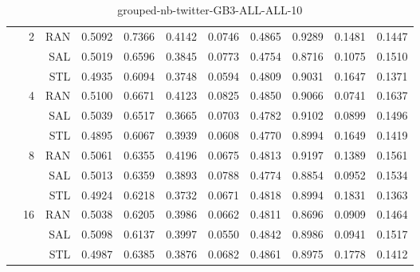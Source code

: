 \begin{center}
\begin{table}[htbp]
\begin{center}
\begin{tabular}{ | r | r | r | r | r | r | r | r | r | r | r |}
 & \multirow{3}{*}{2} & RAN & 0.5092 & 0.7366 & 0.4142 & 0.0746 & 0.4865 & 0.9289 & 0.1481 & 0.1447\\ \cline{3-11}
 &   & SAL & 0.5019 & 0.6596 & 0.3845 & 0.0773 & 0.4754 & 0.8716 & 0.1075 & 0.1510\\ \cline{3-11}
 &   & STL & 0.4935 & 0.6094 & 0.3748 & 0.0594 & 0.4809 & 0.9031 & 0.1647 & 0.1371\\ \cline{2-11}
 & \multirow{3}{*}{4} & RAN & 0.5100 & 0.6671 & 0.4123 & 0.0825 & 0.4850 & 0.9066 & 0.0741 & 0.1637\\ \cline{3-11}
 &   & SAL & 0.5039 & 0.6517 & 0.3665 & 0.0703 & 0.4782 & 0.9102 & 0.0899 & 0.1496\\ \cline{3-11}
 &   & STL & 0.4895 & 0.6067 & 0.3939 & 0.0608 & 0.4770 & 0.8994 & 0.1649 & 0.1419\\ \cline{2-11}
 & \multirow{3}{*}{8} & RAN & 0.5061 & 0.6355 & 0.4196 & 0.0675 & 0.4813 & 0.9197 & 0.1389 & 0.1561\\ \cline{3-11}
 &   & SAL & 0.5013 & 0.6359 & 0.3893 & 0.0788 & 0.4774 & 0.8854 & 0.0952 & 0.1534\\ \cline{3-11}
 &   & STL & 0.4924 & 0.6218 & 0.3732 & 0.0671 & 0.4818 & 0.8994 & 0.1831 & 0.1363\\ \cline{2-11}
 & \multirow{3}{*}{16} & RAN & 0.5038 & 0.6205 & 0.3986 & 0.0662 & 0.4811 & 0.8696 & 0.0909 & 0.1464\\ \cline{3-11}
 &   & SAL & 0.5098 & 0.6137 & 0.3997 & 0.0550 & 0.4842 & 0.8986 & 0.0941 & 0.1517\\ \cline{3-11}
 &   & STL & 0.4987 & 0.6385 & 0.3876 & 0.0682 & 0.4861 & 0.8975 & 0.1778 & 0.1412\\ \cline{2-11}
\hline
\end{tabular}
\caption{grouped-nb-twitter-GB3-ALL-ALL-10}
\end{center}
 \end{table}
\end{center}

